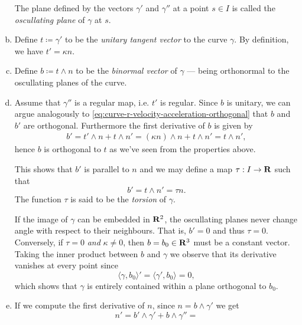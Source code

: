 \begin{definition}
\begin{enumerate}[(a)]
            The plane defined by the vectors \(\gamma'\) and \(\gamma''\) at a point \(s \in I\) is
            called the \emph{oscullating plane} of \(\gamma\) at \(s\).

        \item Define \(t \coloneq \gamma'\) to be the \emph{unitary tangent vector} to the curve
            \(\gamma\). By definition, we have \(t' = \kappa n\).
        
        \item Define \(b \coloneq t \wedge n\) to be the \emph{binormal vector} of \(\gamma\) ---
            being orthonormal to the oscullating planes of the curve. 

        \item Assume that \(\gamma''\) is a regular map, i.e. \(t'\) is regular. Since \(b\) is
            unitary, we can argue analogously to \cref{eq:curve-r-velocity-acceleration-orthogonal}
            that \(b\) and \(b'\) are orthogonal. Furthermore the first derivative of \(b\) is given
            by
            \begin{align*}
                b' = t' \wedge n + t \wedge n'
                = (\kappa n) \wedge n + t \wedge n'
                = t \wedge n',
            \end{align*}
            hence \(b\) is orthogonal to \(t\) as we've seen from the properties above.

            This shows that \(b'\) is parallel to \(n\) and we may define a map \(\tau: I \to \mathbf{R}\)
            such that
            \[
                b' = t \wedge n' = \tau n.
            \]
            The function \(\tau\) is said to be the \emph{torsion} of \(\gamma\).

            If the image of \(\gamma\) can be embedded in \(\mathbf{R}^2\), the oscullating planes never
            change angle with respect to their neighbours. That is, \(b' = 0\) and thus \(\tau = 0\).
            Conversely, if \(\tau = 0\) \emph{and} \(\kappa \neq 0\), then \(b = b_0 \in \mathbf{R}^3\)
            must be a constant vector. Taking the inner product between \(b\) and \(\gamma\) we
            observe that its derivative vanishes at every point since
            \[
                \langle \gamma, b_0 \rangle' = \langle \gamma', b_0 \rangle = 0,
            \]
            which shows that \(\gamma\) is entirely contained within a plane orthogonal to \(b_0\).

        \item If we compute the first derivative of \(n\), since \(n = b \wedge \gamma'\) we get
            \[
                n' = b' \wedge \gamma' + b \wedge \gamma'' = 
            \]
    \end{enumerate}
\end{definition}
